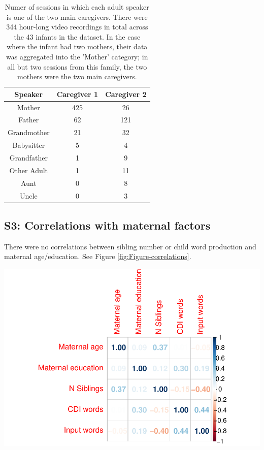 \documentclass[
  man,floatsintext]{apa6}
\begin{document}
\begin{longtable}[t]{ccc}
\caption{\label{tab:table-speakers-sessions}Numer of sessions in which each adult speaker is one of the two main caregivers. There were 344 hour-long video recordings in total across the 43 infants in the dataset. In the case where the infant had two mothers, their data was aggregated into the 'Mother' category; in all but two sessions from this family, the two mothers were the two main caregivers.}\\
\toprule
Speaker & Caregiver 1 & Caregiver 2\\
\midrule
Mother & 425 & 26\\
Father & 62 & 121\\
Grandmother & 21 & 32\\
Babysitter & 5 & 4\\
Grandfather & 1 & 9\\
\addlinespace
Other Adult & 1 & 11\\
Aunt & 0 & 8\\
Uncle & 0 & 3\\
\bottomrule
\end{longtable}

\newpage

\hypertarget{s3-correlations-with-maternal-factors}{%
\subsection{S3: Correlations with maternal factors}\label{s3-correlations-with-maternal-factors}}

There were no correlations between sibling number or child word production and maternal age/education. See Figure \ref{fig:Figure-correlations}.

\includegraphics{SiblingsStudy_SupplementaryData_files/figure-latex/Figure-correlations-1.pdf}
\newpage
\end{document}
